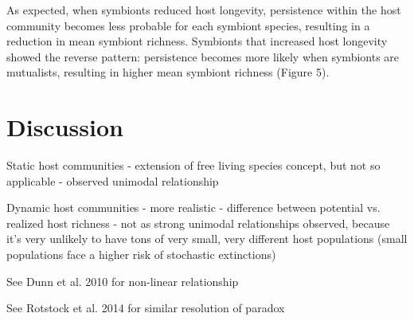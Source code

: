 \documentclass[12pt]{article}
\begin{document}
As expected, when symbionts reduced host longevity, persistence within the host community becomes less probable for each symbiont species, resulting in a reduction in mean symbiont richness. 
Symbionts that increased host longevity showed the reverse pattern: persistence becomes more likely when symbionts are mutualists, resulting in higher mean symbiont richness (Figure 5). 

\section{Discussion}

Static host communities 
- extension of free living species concept, but not so applicable
- observed unimodal relationship

Dynamic host communities
- more realistic
- difference between potential vs. realized host richness
- not as strong unimodal relationships observed, because it's very unlikely to have tons of very small, very different host populations (small populations face a higher risk of stochastic extinctions)

See Dunn et al. 2010 for non-linear relationship

See Rotstock et al. 2014 for similar resolution of paradox



\end{document}
